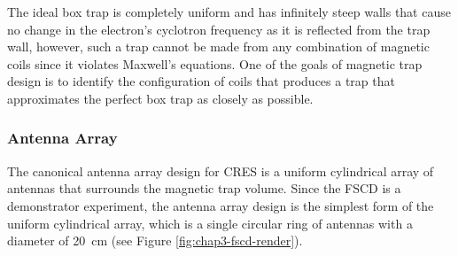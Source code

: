 The ideal box trap is completely uniform and has infinitely steep walls that cause no change in the electron's cyclotron frequency as it is reflected from the trap wall, however, such a trap cannot be made from any combination of magnetic coils since it violates Maxwell's equations. One of the goals of magnetic trap design is to identify the configuration of coils that produces a trap that approximates the perfect box trap as closely as possible.

\subsubsection*{Antenna Array}

The canonical antenna array design for CRES is a uniform cylindrical array of antennas that surrounds the magnetic trap volume. Since the FSCD is a demonstrator experiment, the antenna array design is the simplest form of the uniform cylindrical array, which is a single circular ring of antennas with a diameter of 20~cm (see Figure \ref{fig:chap3-fscd-render}).
